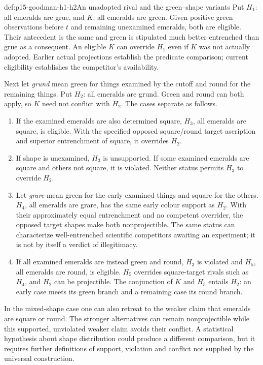 \begin{hbexample}{def:p15-goodman-h1-h2}{An unadopted rival and the green--shape variants}
Put $H_1$: all emeralds are grue, and $K$: all emeralds are green.
Given positive green observations before $t$ and remaining unexamined
emeralds, both are eligible. Their antecedent is the same and green is
stipulated much better entrenched than grue as a consequent. An eligible
$K$ can override $H_1$ even if $K$ was not actually adopted. Earlier
actual projections establish the predicate comparison; current eligibility
establishes the competitor's availability.

Next let \emph{grund} mean green for things examined by the cutoff and
round for the remaining things. Put $H_2$: all emeralds are grund.
Green and round can both apply, so $K$ need not conflict with $H_2$.
The cases separate as follows.
\begin{enumerate}
\item If the examined emeralds are also determined square, $H_3$, all
emeralds are square, is eligible. With the specified opposed square/round
target ascription and superior entrenchment of square, it overrides $H_2$.
\item If shape is unexamined, $H_3$ is unsupported. If some examined
emeralds are square and others not square, it is violated. Neither status
permits $H_3$ to override $H_2$.
\item Let \emph{grare} mean green for the early examined things and square
for the others. $H_4$, all emeralds are grare, has the same early colour
support as $H_2$. With their approximately equal entrenchment and no
competent overrider, the opposed target shapes make both nonprojectible.
The same status can characterize well-entrenched scientific competitors
awaiting an experiment; it is not by itself a verdict of illegitimacy.
\item If all examined emeralds are instead green and round, $H_3$ is
violated and $H_5$, all emeralds are round, is eligible. $H_5$ overrides
square-target rivals such as $H_4$, and $H_2$ can be projectible. The
conjunction of $K$ and $H_5$ entails $H_2$: an early case meets its green
branch and a remaining case its round branch.
\end{enumerate}
In the mixed-shape case one can also retreat to the weaker claim that
emeralds are square or round. The stronger alternatives can remain
nonprojectible while this supported, unviolated weaker claim avoids
their conflict. A statistical hypothesis about shape distribution could
produce a different comparison, but it requires further definitions of
support, violation and conflict not supplied by the universal construction.
\parencite[IV.4, pp.~99--104 and n.~13]{Goodman1983FourthProjection}
\end{hbexample}


